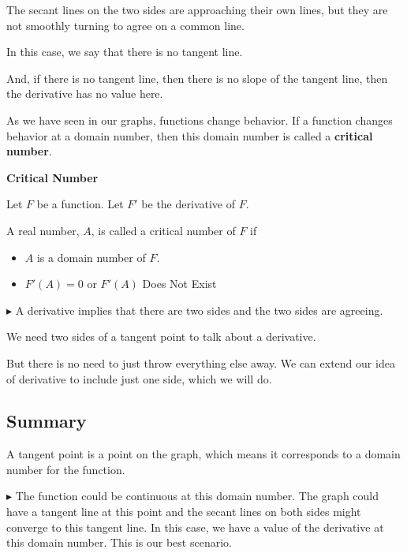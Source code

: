 \documentclass{ximera}
\begin{document}
The secant lines on the two sides are approaching their own lines, but they are not smoothly turning to agree on a common line. 


In this case, we say that there is no tangent line. 

And, if there is no tangent line, then there is no slope of the tangent line, then the derivative has no value here. 


As we have seen in our graphs, functions change behavior. If a function changes behavior at a domain number, then this domain number is called a \textbf{critical number}.


\begin{definition} \textbf{\textcolor{green!50!black}{Critical Number}}

Let $F$ be a function.
Let $F'$ be the derivative of $F$.

A real number, $A$, is called a critical number of $F$ if

\begin{itemize}
\item $A$ is a domain number of $F$.
\item $F'(A) = 0$ or $F'(A)$ Does Not Exist
\end{itemize}

\end{definition}




\textbf{\textcolor{blue!55!black}{$\blacktriangleright$}} A derivative implies that there are two sides and the two sides are agreeing. 

We need two sides of a tangent point to talk about a derivative.

But there is no need to just throw everything else away.  We can extend our idea of derivative to include just one side, which we will do. 






\subsection*{Summary}


A tangent point is a point on the graph, which means it corresponds to a domain number for the function. 


\textbf{\textcolor{blue!55!black}{$\blacktriangleright$}}  The function could be continuous at this domain number. The graph could have a tangent line at this point and the secant lines on both sides might converge to this tangent line.  In this case, we have a value of the derivative at this domain number. This is our best scenario. 
\end{document}
